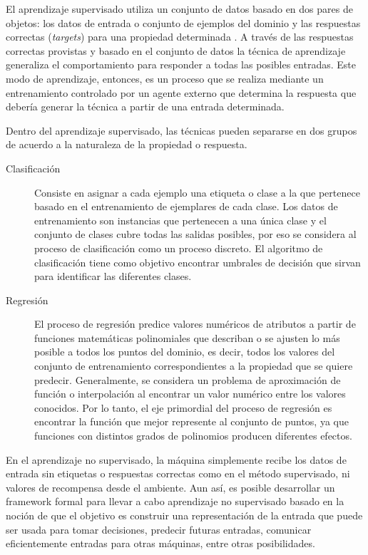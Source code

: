 El aprendizaje supervisado utiliza un conjunto de datos basado en
dos pares de objetos: los datos de entrada o conjunto de ejemplos
del dominio y las respuestas correctas (\emph{targets}) para una propiedad
determinada . A través de las respuestas correctas provistas y basado
en el conjunto de datos la técnica de aprendizaje generaliza el comportamiento
para responder a todas las posibles entradas. Este modo de aprendizaje,
entonces, es un proceso que se realiza mediante un entrenamiento controlado
por un agente externo que determina la respuesta que debería generar
la técnica a partir de una entrada determinada. 

Dentro del aprendizaje supervisado, las técnicas pueden separarse
en dos grupos de acuerdo a la naturaleza de la propiedad o respuesta. 
\begin{description}
\item [{Clasificación}] Consiste en asignar a cada ejemplo una etiqueta
o clase a la que pertenece basado en el entrenamiento de ejemplares
de cada clase. Los datos de entrenamiento son instancias que pertenecen
a una única clase y el conjunto de clases cubre todas las salidas
posibles, por eso se considera al proceso de clasificación como un
proceso discreto. El algoritmo de clasificación tiene como objetivo
encontrar umbrales de decisión que sirvan para identificar las diferentes
clases.
\item [{Regresión}] El proceso de regresión predice valores numéricos de
atributos a partir de funciones matemáticas polinomiales que describan
o se ajusten lo más posible a todos los puntos del dominio, es decir,
todos los valores del conjunto de entrenamiento correspondientes a
la propiedad que se quiere predecir. Generalmente, se considera un
problema de aproximación de función o interpolación al encontrar un
valor numérico entre los valores conocidos. Por lo tanto, el eje primordial
del proceso de regresión es encontrar la función que mejor represente
al conjunto de puntos, ya que funciones con distintos grados de polinomios
producen diferentes efectos.
\end{description}
En el aprendizaje no supervisado, la máquina simplemente recibe los
datos de entrada sin etiquetas o respuestas correctas como en el método
supervisado, ni valores de recompensa desde el ambiente. Aun así,
es posible desarrollar un framework formal para llevar a cabo aprendizaje
no supervisado basado en la noción de que el objetivo es construir
una representación de la entrada que puede ser usada para tomar decisiones,
predecir futuras entradas, comunicar eficientemente entradas para
otras máquinas, entre otras posibilidades. 

